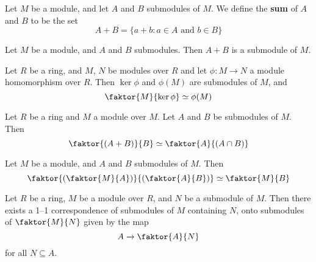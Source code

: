\begin{definition}
    Let $M$ be a module, and let  $A$ and $B$ submodules of  $M$. We define the
     \textbf{sum} of $A$ and  $B$ to be the set
     \begin{equation*}
         A+B=\{a+b : a \in A \text{ and } b \in B\}
     \end{equation*}
\end{definition}

\begin{lemma}\label{lemma_4.2.4}
    Let $M$ be a module, and  $A$ and  $B$ submodules. Then  $A+B$ is a
    submodule of  $M$.
\end{lemma}

\begin{theorem}\label{4.2.5}
    Let $R$ be a ring, and  $M$,  $N$ be modules over  $R$ and let  $\phi:M
    \xrightarrow{} N$ a module homomorphism over $R$. Then  $\ker{\phi}$ and
    $\phi(M)$ are submodules of $M$, and
    \begin{equation*}
        \faktor{M}{\ker{\phi}} \simeq \phi(M)
    \end{equation*}
\end{theorem}

\begin{theorem}\label{4.2.6}
    Let $R$ be a ring and $M$ a module over $M$. Let  $A$ and  $B$ be submodules
    of  $M$. Then
    \begin{equation*}
        \faktor{(A+B)}{B} \simeq \faktor{A}{(A \cap B)}
    \end{equation*}
\end{theorem}

\begin{theorem}\label{4.2.7}
    Let $M$ be a module, and  $A$ and  $B$ submodules of  $M$. Then
    \begin{equation*}
       \faktor{(\faktor{M}{A})}{(\faktor{A}{B})} \simeq \faktor{M}{B}
    \end{equation*}
\end{theorem}

\begin{theorem}\label{4.2.8}
    Let $R$ be a ring,  $M$ be a module over  $R$, and  $N$ be a submodule of
    $M$. Then there exists a 1--1 correspondence of submodules of  $M$
    containing  $N$, onto  submodules of $\faktor{M}{N}$ given by the map
    \begin{equation*}
        A \xrightarrow{} \faktor{A}{N}
    \end{equation*}
    for all $N \subseteq A$.
\end{theorem}
